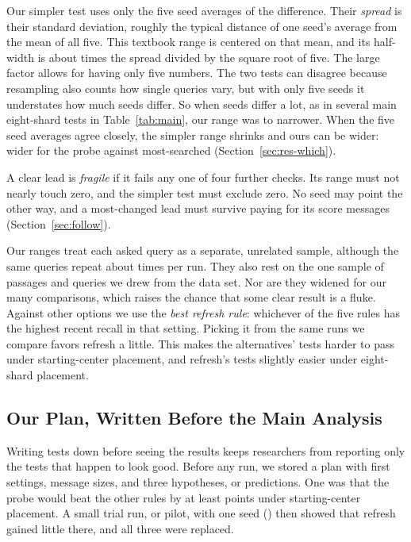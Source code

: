 Our simpler test uses only the five seed averages of the difference.
Their \emph{spread} is their standard deviation, roughly the typical distance of one seed's average from the mean of all five.
This textbook range is centered on that mean, and its half-width is about \RNumPlainTCritFive{} times the spread divided by the square root of five.
The large factor allows for having only five numbers.
The two tests can disagree because resampling also counts how single queries vary, but with only five seeds it understates how much seeds differ.
So when seeds differ a lot, as in several main eight-shard tests in Table~\ref{tab:main}, our range was \RNumBootNarrowerMin{} to \RNumBootNarrowerMax{} narrower.
When the five seed averages agree closely, the simpler range shrinks and ours can be wider: \RNumBootWiderMThreeRNMinusQLNewTopic{} wider for the probe against most-searched (Section~\ref{sec:res-which}).

A clear lead is \emph{fragile} if it fails any one of four further checks.
Its range must not nearly touch zero, and the simpler test must exclude zero.
No seed may point the other way, and a most-changed lead must survive paying for its score messages (Section~\ref{sec:follow}).

Our ranges treat each asked query as a separate, unrelated sample, although the same \RNumPlainTestQueries{} queries repeat about \RNumQueryRepeatsQTwoHundred{} times per run.
They also rest on the one sample of passages and queries we drew from the data set.
Nor are they widened for our many comparisons, which raises the chance that some clear result is a fluke.
Against other options we use the \emph{best refresh rule}: whichever of the five rules has the highest recent recall in that setting.
Picking it from the same runs we compare favors refresh a little.
This makes the alternatives' tests harder to pass under starting-center placement, and refresh's tests slightly easier under eight-shard placement.

\subsection{Our Plan, Written Before the Main Analysis}

Writing tests down before seeing the results keeps researchers from reporting only the tests that happen to look good.
Before any run, we stored a plan with first settings, message sizes, and three hypotheses, or predictions.
One was that the probe would beat the other rules by at least \RNumPlainGateThreshold{} points under starting-center placement.
A small trial run, or pilot, with one seed (\RNumPilotSeed{}) then showed that refresh gained little there, and all three were replaced.

